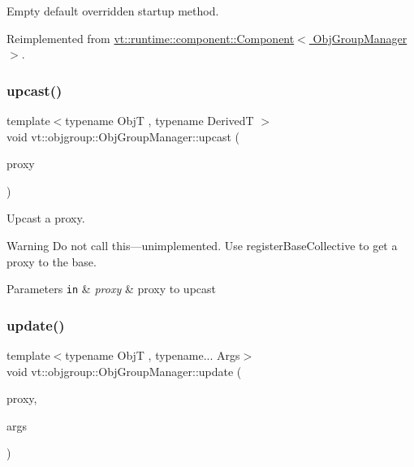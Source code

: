 Empty default overridden startup method. 



Reimplemented from \hyperlink{structvt_1_1runtime_1_1component_1_1_component_aad3974307ab3b2e1df389a91310f68c2}{vt\+::runtime\+::component\+::\+Component$<$ Obj\+Group\+Manager $>$}.

\mbox{\label{structvt_1_1objgroup_1_1_obj_group_manager_abddd0f80c5b0f625a4ed487414c3b39b}} 
\subsubsection{\texorpdfstring{upcast()}{upcast()}}
{\footnotesize\ttfamily template$<$typename ObjT , typename DerivedT $>$ \\
void vt\+::objgroup\+::\+Obj\+Group\+Manager\+::upcast (\begin{DoxyParamCaption}\item[{\hyperlink{structvt_1_1objgroup_1_1_obj_group_manager_aea65eef52f240a52210132eef5ce591f}{Proxy\+Type}$<$ ObjT $>$}]{proxy }\end{DoxyParamCaption})}



Upcast a proxy. 

\begin{DoxyWarning}{Warning}
Do not call this---unimplemented. Use {\ttfamily register\+Base\+Collective} to get a proxy to the base.
\end{DoxyWarning}

\begin{DoxyParams}[1]{Parameters}
\mbox{\tt in}  & {\em proxy} & proxy to upcast \\
\hline
\end{DoxyParams}
\mbox{\label{structvt_1_1objgroup_1_1_obj_group_manager_abd0f61b0578a268a27420f2c38e3b12d}} 
\subsubsection{\texorpdfstring{update()}{update()}\hspace{0.1cm}{\footnotesize\ttfamily [1/2]}}
{\footnotesize\ttfamily template$<$typename ObjT , typename... Args$>$ \\
void vt\+::objgroup\+::\+Obj\+Group\+Manager\+::update (\begin{DoxyParamCaption}\item[{\hyperlink{structvt_1_1objgroup_1_1_obj_group_manager_adba6c8ecb0f4c30e719f1abb995cfc9b}{Proxy\+Elm\+Type}$<$ ObjT $>$}]{proxy,  }\item[{Args \&\&...}]{args }\end{DoxyParamCaption})}



